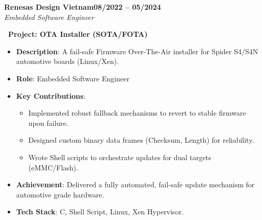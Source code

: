 \documentclass[letterpaper,10pt]{article}
\newcommand{\heading}[2]{
  \hspace{10pt}#1\hfill#2\\
}
\newcommand{\headingBf}[2]{
  \heading{\textbf{#1}}{\textbf{#2}}
}
\newcommand{\headingIt}[2]{
  \heading{\textit{#1}}{\textit{#2}}
}
\newenvironment{resume_list}{
  \vspace{-7pt}
  \begin{itemize}[itemsep=-2px, parsep=1pt, leftmargin=30pt]
}{
  \end{itemize}
}
\begin{document}
  \headingBf{Renesas Design Vietnam}{08/2022 -- 05/2024}
   \headingIt{Embedded Software Engineer}{}
   \begin{resume_list}
     \item \textbf{\faSync\ Project: OTA Installer (SOTA/FOTA)}
       \begin{itemize}[itemsep=1pt, leftmargin=15pt, label=-]
         \item \textbf{Description}: A fail-safe Firmware Over-The-Air installer for Spider S4/S4N automotive boards (Linux/Xen).
         \item \textbf{Role}: Embedded Software Engineer
         \item \textbf{Key Contributions}:
            \begin{itemize}[itemsep=0pt, leftmargin=10pt, label=$\circ$]
              \item Implemented robust fallback mechanisms to revert to stable firmware upon failure.
              \item Designed custom binary data frames (Checksum, Length) for reliability.
              \item Wrote Shell scripts to orchestrate updates for dual targets (eMMC/Flash).
            \end{itemize}
         \item \textbf{Achievement}: Delivered a fully automated, fail-safe update mechanism for automotive grade hardware.
         \item \textbf{Tech Stack}: C, Shell Script, Linux, Xen Hypervisor.
       \end{itemize}




\end{resume_list}
\end{document}
